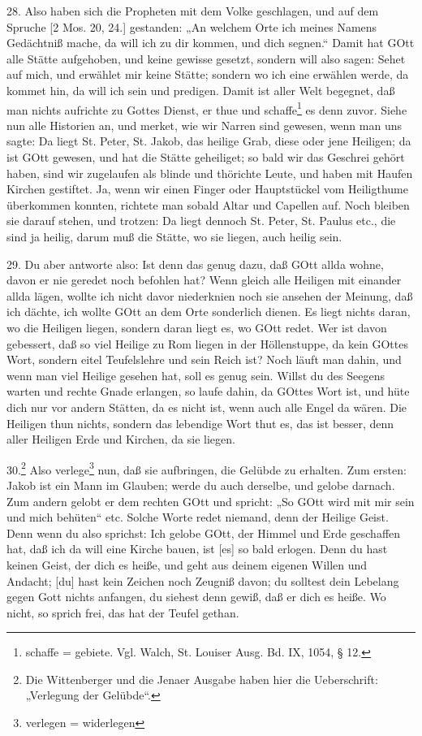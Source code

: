 28. Also haben sich die Propheten mit dem Volke geschlagen, und auf dem Spruche [2 Mos. 20, 24.] gestanden: „An welchem Orte ich meines Namens Gedächtniß mache, da will ich zu dir kommen, und dich segnen.“ Damit hat GOtt alle Stätte aufgehoben, und keine gewisse gesetzt, sondern will also sagen: Sehet auf mich, und erwählet mir keine Stätte; sondern wo ich eine erwählen werde, da kommet hin, da will ich sein und predigen. Damit ist aller Welt begegnet, daß man nichts aufrichte zu Gottes Dienst, er thue und schaffe\footnote{schaffe = gebiete. Vgl. Walch, St. Louiser Ausg. Bd. IX, 1054, § 12.} es denn zuvor. Siehe nun alle Historien an, und merket, wie wir Narren sind gewesen, wenn man uns sagte: Da liegt St. Peter, St. Jakob, das heilige Grab, diese oder jene Heiligen; da ist GOtt gewesen, und hat die Stätte geheiliget; so bald wir das Geschrei gehört haben, sind wir zugelaufen als blinde und thörichte Leute, und haben mit Haufen Kirchen gestiftet. Ja, wenn wir einen Finger oder Hauptstückel vom Heiligthume überkommen konnten, richtete man sobald Altar und Capellen auf. Noch bleiben sie darauf stehen, und trotzen: Da liegt dennoch St. Peter, St. Paulus etc., die sind ja heilig, darum muß die Stätte, wo sie liegen, auch heilig sein.

29. Du aber antworte also: Ist denn das genug dazu, daß GOtt allda wohne, davon er nie geredet noch befohlen hat? Wenn gleich alle Heiligen mit einander allda lägen, wollte ich nicht davor niederknien noch sie ansehen der Meinung, daß ich dächte, ich wollte GOtt an dem Orte sonderlich dienen. Es liegt nichts daran, wo die Heiligen liegen, sondern daran liegt es, wo GOtt redet. Wer ist davon gebessert, daß so viel Heilige zu Rom liegen in der Höllenstuppe, da kein GOttes Wort, sondern
eitel Teufelslehre und sein Reich ist? Noch läuft man dahin, und wenn man viel Heilige gesehen hat, soll es genug sein. Willst du des Seegens warten und rechte Gnade erlangen, so laufe dahin, da GOttes Wort ist, und hüte dich nur vor andern Stätten, da es nicht ist, wenn auch alle Engel da wären. Die Heiligen thun nichts, sondern das lebendige Wort thut es, das ist besser, denn aller Heiligen Erde und Kirchen, da sie liegen.

30.\footnote{Die Wittenberger und die Jenaer Ausgabe haben hier die Ueberschrift: „Verlegung der Gelübde“.} Also verlege\footnote{verlegen = widerlegen} nun, daß sie aufbringen, die Gelübde zu erhalten. Zum ersten: Jakob ist ein Mann im Glauben; werde du auch derselbe, und gelobe darnach. Zum andern gelobt er dem rechten GOtt und spricht: „So GOtt wird mit mir sein und mich behüten“ etc. Solche Worte redet niemand, denn der Heilige Geist. Denn wenn du also sprichst: Ich gelobe GOtt, der Himmel und Erde geschaffen hat, daß ich da will eine Kirche bauen, ist [es] so bald erlogen. Denn du hast keinen Geist, der dich es heiße, und geht aus deinem eigenen Willen und Andacht; [du] hast kein Zeichen noch Zeugniß davon; du solltest dein Lebelang gegen Gott nichts anfangen, du siehest denn gewiß, daß er dich es heiße. Wo nicht, so sprich frei, das hat der Teufel gethan.

